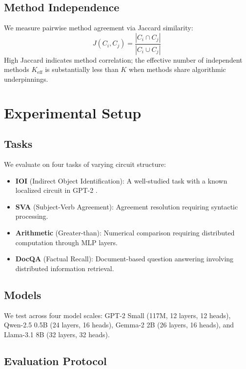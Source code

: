 \documentclass[11pt]{article}
\begin{document}
\subsection{Method Independence}

We measure pairwise method agreement via Jaccard similarity:
\begin{equation}
    J(C_i, C_j) = \frac{|C_i \cap C_j|}{|C_i \cup C_j|}
\end{equation}
High Jaccard indicates method correlation; the effective number of independent methods $K_{\text{eff}}$ is substantially less than $K$ when methods share algorithmic underpinnings.

\section{Experimental Setup}

\subsection{Tasks}

We evaluate on four tasks of varying circuit structure:
\begin{itemize}
    \item \textbf{IOI} (Indirect Object Identification): A well-studied task with a known localized circuit in GPT-2 \citep{wang2023interpretability}.
    \item \textbf{SVA} (Subject-Verb Agreement): Agreement resolution requiring syntactic processing.
    \item \textbf{Arithmetic} (Greater-than): Numerical comparison requiring distributed computation through MLP layers.
    \item \textbf{DocQA} (Factual Recall): Document-based question answering involving distributed information retrieval.
\end{itemize}

\subsection{Models}

We test across four model scales: GPT-2 Small (117M, 12 layers, 12 heads), Qwen-2.5 0.5B (24 layers, 16 heads), Gemma-2 2B (26 layers, 16 heads), and Llama-3.1 8B (32 layers, 32 heads).

\subsection{Evaluation Protocol}
\end{document}
